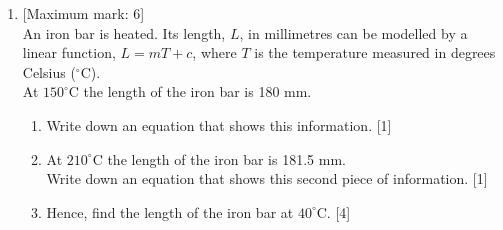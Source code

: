 \documentclass[12pt, twoside]{article}
\begin{document}
\begin{enumerate}[itemsep=0.5cm]
\newpage
\item {[Maximum mark: 6]} \\[0.3cm]
    An iron bar is heated. Its length, $L$, in millimetres can be modelled by a linear function, $L=mT+c$, where $T$ is the temperature measured in degrees Celsius ($^\circ$C). \\[0.25cm]
    At $150^\circ$C the length of the iron bar is 180 mm.
    \begin{enumerate}[itemsep=0.25cm]
        \item Write down an equation that shows this information. \hfill [1]
        \item At $210^\circ$C the length of the iron bar is 181.5 mm. \\[0.25cm]
        Write down an equation that shows this second piece of information. \hfill [1]
        \item Hence, find the length of the iron bar at $40^\circ$C. \hfill [4]
    \end{enumerate}


\end{enumerate}
\end{document}
